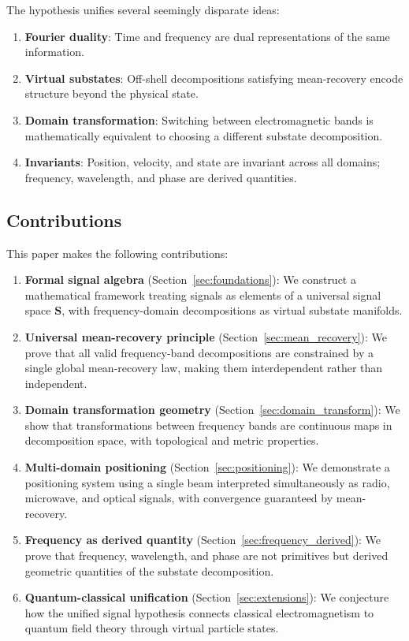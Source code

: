 \documentclass[twocolumn,11pt,a4paper]{article}
\newcommand{\Signal}{\mathbf{S}}
\begin{document}
The hypothesis unifies several seemingly disparate ideas:
\begin{enumerate}[nosep]
  \item \textbf{Fourier duality}: Time and frequency are dual representations of the same information.
  \item \textbf{Virtual substates}: Off-shell decompositions satisfying mean-recovery encode structure beyond the physical state.
  \item \textbf{Domain transformation}: Switching between electromagnetic bands is mathematically equivalent to choosing a different substate decomposition.
  \item \textbf{Invariants}: Position, velocity, and state are invariant across all domains; frequency, wavelength, and phase are derived quantities.
\end{enumerate}

\subsection{Contributions}

This paper makes the following contributions:

\begin{enumerate}[leftmargin=1.5em,topsep=2pt,itemsep=1pt]
  \item \textbf{Formal signal algebra} (Section~\ref{sec:foundations}): We construct a mathematical framework treating signals as elements of a universal signal space $\Signal$, with frequency-domain decompositions as virtual substate manifolds.

  \item \textbf{Universal mean-recovery principle} (Section~\ref{sec:mean_recovery}): We prove that all valid frequency-band decompositions are constrained by a single global mean-recovery law, making them interdependent rather than independent.

  \item \textbf{Domain transformation geometry} (Section~\ref{sec:domain_transform}): We show that transformations between frequency bands are continuous maps in decomposition space, with topological and metric properties.

  \item \textbf{Multi-domain positioning} (Section~\ref{sec:positioning}): We demonstrate a positioning system using a single beam interpreted simultaneously as radio, microwave, and optical signals, with convergence guaranteed by mean-recovery.

  \item \textbf{Frequency as derived quantity} (Section~\ref{sec:frequency_derived}): We prove that frequency, wavelength, and phase are not primitives but derived geometric quantities of the substate decomposition.

  \item \textbf{Quantum-classical unification} (Section~\ref{sec:extensions}): We conjecture how the unified signal hypothesis connects classical electromagnetism to quantum field theory through virtual particle states.
\end{enumerate}
\end{document}
